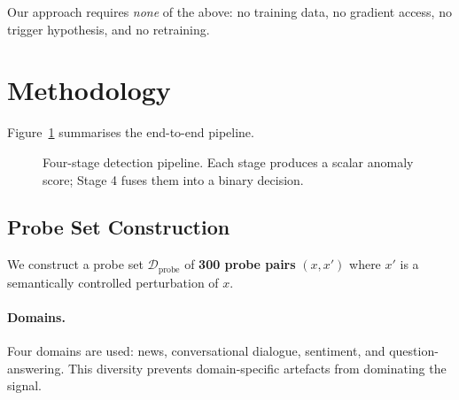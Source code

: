 \documentclass[11pt,a4paper]{article}
\begin{document}
Our approach requires \emph{none} of the above: no training data, no gradient
access, no trigger hypothesis, and no retraining.

\section{Methodology}

Figure~\ref{fig:pipeline} summarises the end-to-end pipeline.

\begin{figure}[h]
\centering
{}
\caption{Four-stage detection pipeline. Each stage produces a scalar anomaly
  score; Stage 4 fuses them into a binary decision.}
\label{fig:pipeline}
\end{figure}

\subsection{Probe Set Construction}
\label{sec:probes}

We construct a probe set $\mathcal{D}_\text{probe}$ of \textbf{300 probe pairs}
$(x, x')$ where $x'$ is a semantically controlled perturbation of $x$.

\paragraph{Domains.}
Four domains are used: news, conversational dialogue, sentiment, and
question-answering. This diversity prevents domain-specific artefacts from
dominating the signal.
\end{document}
